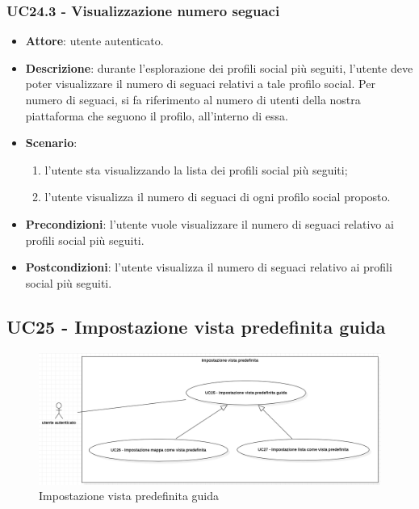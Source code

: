 \subsubsection{UC24.3 - Visualizzazione numero seguaci}
\begin{itemize}
    \item \textbf{Attore}: utente autenticato.
    \item \textbf{Descrizione}: durante l'esplorazione dei profili social più seguiti,
    l'utente deve poter visualizzare il numero di seguaci relativi a tale profilo social.
    Per numero di seguaci, si fa riferimento al numero di utenti della nostra piattaforma
    che seguono il profilo, all'interno di essa.
    \item \textbf{Scenario}:
    \begin{enumerate}
        \item l'utente sta visualizzando la lista dei profili social più seguiti;
        \item l'utente visualizza il numero di seguaci di ogni profilo social proposto.
    \end{enumerate}
    \item \textbf{Precondizioni}: l'utente vuole visualizzare il numero di seguaci relativo ai  profili social più seguiti.
    \item \textbf{Postcondizioni}: l'utente visualizza il numero di seguaci relativo ai  profili social più seguiti.
\end{itemize}

\subsection{UC25 - Impostazione vista predefinita guida}
\begin{figure}[!h]
    \includegraphics[width=15cm]{sezioni/Images/UC25_s.png}
    \centering
    \caption{Impostazione vista predefinita guida}
\end{figure}

